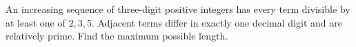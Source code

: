 An increasing sequence of three-digit positive integers has every term divisible by at least one of $2,3,5$. Adjacent terms differ in exactly one decimal digit and are relatively prime. Find the maximum possible length.
